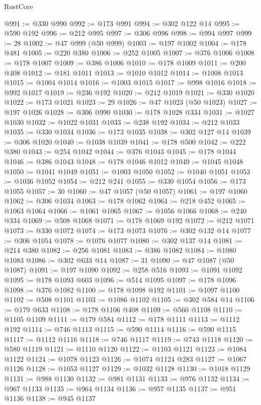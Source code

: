 \begin{lexlean}{RustCore}
\begin{coremodule}
@991 := @330 @990
@992 := @173 @991
@994 := @302 @122 @14
@995 := @590 @192
@996 := @212 @995
@997 := @306 @996
@998 := @994 @997
@999 := 28
@1002 := @47 @999 (@50 @999)
@1003 := @197 @1002
@1004 := @178 @481
@1005 := @220 @380
@1006 := @252 @1005
@1007 := @376 @1006
@1008 := @178 @1007
@1009 := @386 @1006
@1010 := @178 @1009
@1011 := @200 @408
@1012 := @181 @1011
@1013 := @1010 @1012
@1014 := @1008 @1013
@1015 := @1004 @1014
@1016 := @1003 @1015
@1017 := @998 @1016
@1018 := @992 @1017
@1019 := @236 @192
@1020 := @212 @1019
@1021 := @330 @1020
@1022 := @173 @1021
@1023 := 29
@1026 := @47 @1023 (@50 @1023)
@1027 := @197 @1026
@1028 := @306 @990
@1030 := @178 @1028 @334
@1031 := @1027 @1030
@1032 := @1022 @1031
@1033 := @238 @192
@1034 := @212 @1033
@1035 := @330 @1034
@1036 := @173 @1035
@1038 := @302 @127 @14
@1039 := @306 @1020
@1040 := @1038 @1039
@1041 := @178 @500
@1042 := @222 @380
@1043 := @254 @1042
@1044 := @376 @1043
@1045 := @178 @1044
@1046 := @386 @1043
@1048 := @178 @1046 @1012
@1049 := @1045 @1048
@1050 := @1041 @1049
@1051 := @1003 @1050
@1052 := @1040 @1051
@1053 := @1036 @1052
@1054 := @212 @241
@1055 := @330 @1054
@1056 := @173 @1055
@1057 := 30
@1060 := @47 @1057 (@50 @1057)
@1061 := @197 @1060
@1062 := @306 @1034
@1063 := @178 @1062
@1064 := @218 @452
@1065 := @1063 @1064
@1066 := @1061 @1065
@1067 := @1056 @1066
@1068 := @240 @334
@1069 := @508 @1068
@1071 := @178 @1069 @192
@1072 := @212 @1071
@1073 := @330 @1072
@1074 := @173 @1073
@1076 := @302 @132 @14
@1077 := @306 @1054
@1078 := @1076 @1077
@1080 := @302 @137 @14
@1081 := @214 @380
@1082 := @256 @1081
@1083 := @386 @1082
@1084 := @1080 @1083
@1086 := @302 @633 @14
@1087 := 31
@1090 := @47 @1087 (@50 @1087)
@1091 := @197 @1090
@1092 := @258 @516
@1093 := @1091 @1092
@1095 := @178 @1093 @603
@1096 := @514 @1095
@1097 := @178 @1096
@1098 := @376 @1082
@1100 := @178 @1098 @192
@1101 := @1097 @1100
@1102 := @508 @1101
@1103 := @1086 @1102
@1105 := @302 @584 @14
@1106 := @179 @633
@1108 := @178 @1106 @408
@1109 := @560 @1108
@1110 := @1105 @1109
@1111 := @179 @584
@1112 := @178 @1111
@1113 := @1112 @192
@1114 := @746 @1113
@1115 := @590 @1114
@1116 := @590 @1115
@1117 := @1112 @1116
@1118 := @746 @1117
@1119 := @743 @1118
@1120 := @580 @1119
@1121 := @1110 @1120
@1122 := @1103 @1121
@1123 := @1084 @1122
@1124 := @1078 @1123
@1126 := @1074 @1124 @283
@1127 := @1067 @1126
@1128 := @1053 @1127
@1129 := @1032 @1128
@1130 := @1018 @1129
@1131 := @988 @1130
@1132 := @981 @1131
@1133 := @976 @1132
@1134 := @967 @1133
@1135 := @964 @1134
@1136 := @957 @1135
@1137 := @951 @1136
@1138 := @945 @1137

\end{coremodule}
\end{lexlean}
